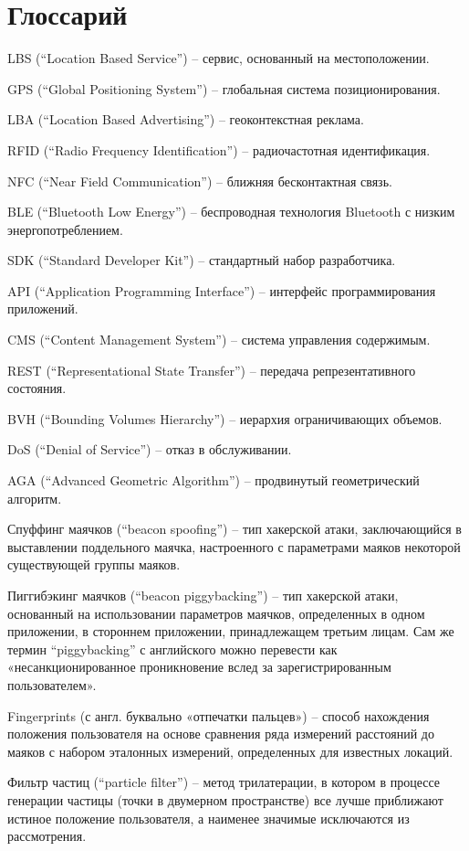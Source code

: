 \section{Глоссарий}

LBS (“Location Based Service”) – сервис, основанный на местоположении.

GPS (“Global Positioning System”) – глобальная система позиционирования.

LBA (“Location Based Advertising”) – геоконтекстная реклама.

RFID (“Radio Frequency Identification”) – радиочастотная идентификация.

NFC (“Near Field Communication”) – ближняя бесконтактная связь.

BLE (“Bluetooth Low Energy”) – беспроводная технология Bluetooth с низким энергопотреблением.

SDK (“Standard Developer Kit”) – стандартный набор разработчика.

API (“Application Programming Interface”) – интерфейс программирования приложений.

CMS (“Content Management System”) – система управления содержимым.

REST (“Representational State Transfer”) – передача репрезентативного состояния.

BVH (“Bounding Volumes Hierarchy”) – иерархия ограничивающих объемов.

DoS (“Denial of Service”) – отказ в обслуживании.

AGA (“Advanced Geometric Algorithm”) – продвинутый геометрический алгоритм.

Спуффинг маячков (“beacon spoofing”) – тип хакерской атаки, заключающийся в выставлении поддельного маячка, настроенного с параметрами маяков некоторой существующей группы маяков.

Пиггибэкинг маячков (“beacon piggybacking”) – тип хакерской атаки, основанный на использовании параметров маячков, определенных в одном приложении, в стороннем приложении, принадлежащем третьим лицам. Сам же термин “piggybacking” с английского можно перевести как «несанкционированное проникновение вслед за зарегистрированным пользователем».

Fingerprints (с англ. буквально «отпечатки пальцев») – способ нахождения положения пользователя на основе сравнения ряда измерений расстояний до маяков с набором эталонных измерений, определенных для известных локаций.

Фильтр частиц (“particle filter”) – метод трилатерации, в котором в процессе генерации частицы (точки в двумерном пространстве) все лучше приближают истиное положение пользователя, а наименее значимые исключаются из рассмотрения.